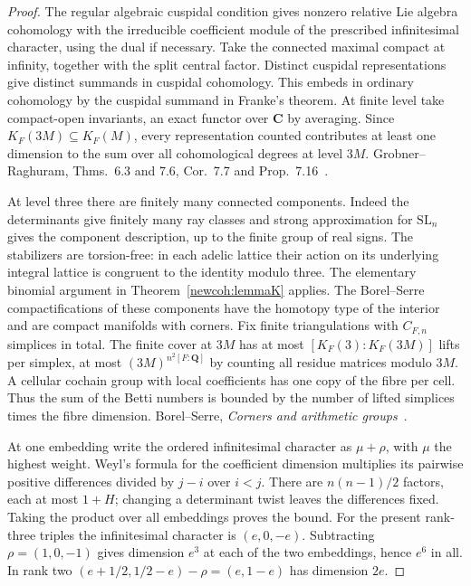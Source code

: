 \begin{proof}
The regular algebraic cuspidal condition gives nonzero relative Lie
algebra cohomology with the irreducible coefficient module of the
prescribed infinitesimal character, using the dual if necessary.
Take the connected maximal compact at infinity, together with the
split central factor. Distinct cuspidal representations give distinct
summands in cuspidal cohomology. This embeds in ordinary cohomology by
the cuspidal summand in Franke's theorem. At finite level take compact-open
invariants, an exact functor over \(\mathbf C\) by averaging. Since
\(K_F(3M)\subseteq K_F(M)\), every representation counted contributes
at least one dimension to the sum over all cohomological degrees at
level \(3M\).
Grobner--Raghuram,
Thms.~6.3 and 7.6, Cor.~7.7 and Prop.~7.16~\cite{grobnerRaghuram}.

At level three there are finitely many connected components. Indeed the
determinants give finitely many ray classes and strong approximation
for \(\mathrm{SL}_n\) gives the component description, up to the
finite group of real signs. The stabilizers are torsion-free: in each
adelic lattice their action on its underlying integral lattice is
congruent to the identity modulo three. The elementary binomial
argument in Theorem~\ref{newcoh:lemmaK} applies. The Borel--Serre
compactifications of these components have the homotopy type of the
interior and are compact manifolds with corners. Fix finite
triangulations with \(C_{F,n}\) simplices in total. The finite cover
at \(3M\) has at most \([K_F(3):K_F(3M)]\) lifts per simplex, at most
\((3M)^{n^2[F:\mathbf Q]}\) by counting all residue matrices modulo
\(3M\). A cellular cochain group with local coefficients has one
copy of the fibre per cell. Thus the sum of the Betti numbers is
bounded by the number of lifted simplices times the fibre dimension.
Borel--Serre,
\emph{Corners and arithmetic groups}~\cite{borelSerre}.

At one embedding write the ordered infinitesimal character as
\(\mu+\rho\), with \(\mu\) the highest weight. Weyl's formula for
the coefficient dimension multiplies its pairwise positive differences
divided by \(j-i\) over \(i<j\). There are \(n(n-1)/2\) factors,
each at most \(1+H\); changing a determinant twist leaves the
differences fixed. Taking the product over all embeddings proves the
bound. For the present rank-three triples the infinitesimal character
is \((e,0,-e)\). Subtracting \(\rho=(1,0,-1)\) gives dimension \(e^3\)
at each of the two embeddings, hence \(e^6\) in all. In rank two
\((e+1/2,1/2-e)-\rho=(e,1-e)\) has dimension \(2e\).
\end{proof}

